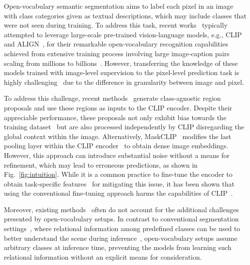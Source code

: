 \documentclass[10pt,twocolumn,letterpaper]{article}
\begin{document}
Open-vocabulary semantic segmentation aims to label each pixel in an image with class  categories given as textual descriptions, which may include classes that were not seen during training. To address this task, recent works~\cite{li2022language,ghiasi2022scaling,ding2022decoupling,liang2022open,xu2022simple} typically attempted to leverage large-scale pre-trained vision-language models, e.g., CLIP~\cite{radford2021learning} and ALIGN~\cite{jia2021scaling}, for their remarkable open-vocabulary recognition capabilities achieved from extensive training process involving large image-caption pairs scaling from millions to billions~\cite{schuhmann2022laion}. However, transferring the knowledge of these models trained with image-level supervision to the pixel-level prediction task is highly challenging~\cite{xu2022simple} due to the difference in granularity between image and pixel.


To address this challenge, recent methods~\cite{liang2022open,ding2022decoupling,xu2022simple} generate class-agnostic region proposals and use these regions as inputs to the CLIP encoder. Despite their appreciable performance, these proposals not only exhibit bias towards the training dataset~\cite{liang2022open} but are also processed independently by CLIP disregarding the global context within the image. Alternatively, MaskCLIP~\cite{zhou2022extract} modifies the last pooling layer within the CLIP encoder~\cite{radford2021learning} to obtain dense image embeddings. However, this approach can introduce substantial noise without a means for refinement, which may lead to erroneous predictions, as shown in Fig.~\ref{fig:intuition}. While it is a common practice to fine-tune the encoder to obtain task-specific features~\cite{long2015fully, he2017mask, chen2017deeplab} for mitigating this issue, it has been shown that using the conventional fine-tuning approach harms the capabilities of CLIP~\cite{zhou2022extract}. 

Moreover, existing methods~\cite{li2022language, ding2022decoupling, ghiasi2022scaling, liang2022open} often do not account for the additional challenges presented by open-vocabulary setups. In contrast to conventional segmentation settings~\cite{long2015fully, he2017mask, he2019adaptive, yu2020context,zhou2022rethinking}, where relational information among predefined classes can be used to better understand the scene during inference~\cite{zhou2022rethinking, he2019adaptive, jin2021mining, yuan2020object}, open-vocabulary setups assume arbitrary classes at inference time, preventing the models from learning such relational information without an explicit means for consideration.
\end{document}
